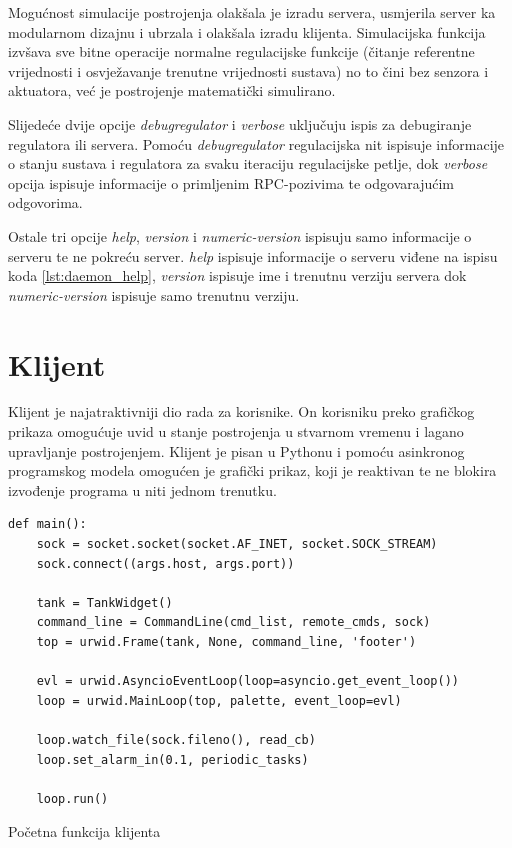 Mogućnost simulacije postrojenja olakšala je izradu servera, usmjerila server ka
modularnom dizajnu i ubrzala i olakšala izradu klijenta. Simulacijska funkcija
izvšava sve bitne operacije normalne regulacijske funkcije (čitanje referentne
vrijednosti i osvježavanje trenutne vrijednosti sustava) no to čini bez senzora
i aktuatora, već je postrojenje matematički simulirano.

Slijedeće dvije opcije \emph{debugregulator} i \emph{verbose} uključuju ispis za
debugiranje regulatora ili servera. Pomoću \emph{debugregulator} regulacijska nit
ispisuje informacije o stanju sustava i regulatora za svaku iteraciju
regulacijske petlje, dok \emph{verbose} opcija ispisuje informacije o primljenim
RPC-pozivima te odgovarajućim odgovorima.

Ostale tri opcije \emph{help}, \emph{version} i \emph{numeric-version} ispisuju
samo informacije o serveru te ne pokreću server. \emph{help} ispisuje
informacije o serveru viđene na ispisu koda \ref{lst:daemon_help},
\emph{version} ispisuje ime i trenutnu verziju servera dok
\emph{numeric-version} ispisuje samo trenutnu verziju.

\newpage
\section{Klijent}

Klijent je najatraktivniji dio rada za korisnike. On korisniku preko grafičkog prikaza 
omogućuje uvid u stanje postrojenja u stvarnom vremenu i lagano
upravljanje postrojenjem. Klijent je pisan u Pythonu i pomoću asinkronog
programskog modela omogućen je grafički prikaz, koji je reaktivan te ne blokira
izvođenje programa u niti jednom trenutku.

\begin{listing}[H]
\centering
\begin{verbatim}
def main():
    sock = socket.socket(socket.AF_INET, socket.SOCK_STREAM)
    sock.connect((args.host, args.port))

    tank = TankWidget()
    command_line = CommandLine(cmd_list, remote_cmds, sock)
    top = urwid.Frame(tank, None, command_line, 'footer')

    evl = urwid.AsyncioEventLoop(loop=asyncio.get_event_loop())
    loop = urwid.MainLoop(top, palette, event_loop=evl)

    loop.watch_file(sock.fileno(), read_cb)
    loop.set_alarm_in(0.1, periodic_tasks)

    loop.run()
\end{verbatim}
\caption{Početna funkcija klijenta}
\label{lst:client main}
\end{listing}

